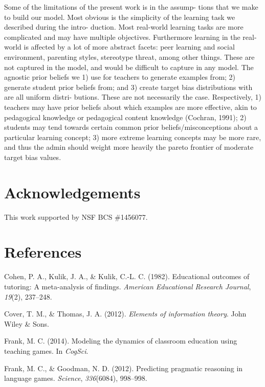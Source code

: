 \documentclass[10pt, letterpaper]{article}
\begin{document}
Some of the limitations of the present work is in the assump- tions that
we make to build our model. Most obvious is the simplicity of the
learning task we described during the intro- duction. Most real-world
learning tasks are more complicated and may have multiple objectives.
Furthermore learning in the real-world is affected by a lot of more
abstract facets: peer learning and social environment, parenting styles,
stereotype threat, among other things. These are not captured in the
model, and would be difficult to capture in any model. The agnostic
prior beliefs we 1) use for teachers to generate examples from; 2)
generate student prior beliefs from; and 3) create target bias
distributions with are all uniform distri- butions. These are not
necessarily the case. Respectively, 1) teachers may have prior beliefs
about which examples are more effective, akin to pedagogical knowledge
or pedagogical content knowledge (Cochran, 1991); 2) students may tend
towards certain common prior beliefs/misconceptions about a particular
learning concept; 3) more extreme learning concepts may be more rare,
and thus the admin should weight more heavily the pareto frontier of
moderate target bias values.

\section{Acknowledgements}\label{acknowledgements}

This work supported by NSF BCS \#1456077.

\section{References}\label{references}

\setlength{\parindent}{-0.1in} \setlength{\leftskip}{0.125in} \noindent

\hypertarget{refs}{}
\hypertarget{ref-cohen1982}{}
Cohen, P. A., Kulik, J. A., \& Kulik, C.-L. C. (1982). Educational
outcomes of tutoring: A meta-analysis of findings. \emph{American
Educational Research Journal}, \emph{19}(2), 237--248.

\hypertarget{ref-cover2012}{}
Cover, T. M., \& Thomas, J. A. (2012). \emph{Elements of information
theory}. John Wiley \& Sons.

\hypertarget{ref-frank2014}{}
Frank, M. C. (2014). Modeling the dynamics of classroom education using
teaching games. In \emph{CogSci}.

\hypertarget{ref-frank2012}{}
Frank, M. C., \& Goodman, N. D. (2012). Predicting pragmatic reasoning
in language games. \emph{Science}, \emph{336}(6084), 998--998.
\end{document}
